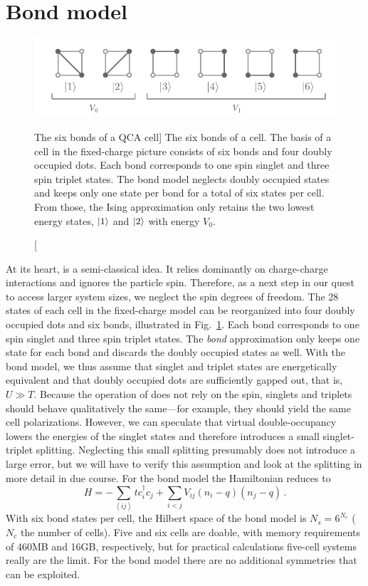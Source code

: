 \section{Bond model}

%
\begin{figure}
  \center
  \includegraphics{bond}
  \caption
  [The six bonds of a QCA cell]
  {
  \label{fig:bond}
  The six bonds of a  cell. The basis of a  cell in the
  fixed-charge picture consists of six bonds and four doubly occupied dots. Each
  bond corresponds to one spin singlet and three spin triplet states. The bond
  model neglects doubly occupied states and keeps only one state per bond for a
  total of six states per cell. From those, the Ising approximation only retains
  the two lowest energy states, $\left|1\right>$ and $\left|2\right>$ with energy $V_0$.
  }
\end{figure}
%
At its heart,  is a semi-classical idea. It relies dominantly on
charge-charge interactions and ignores the particle spin. Therefore, as a next
step in our quest to access larger system sizes, we neglect the spin degrees of
freedom. The 28 states of each cell in the fixed-charge model can be reorganized
into four doubly occupied dots and six bonds, illustrated in
Fig.~\ref{fig:bond}. Each bond corresponds to one spin singlet and three spin
triplet states. The \emph{bond} approximation only keeps one state for each bond
and discards the doubly occupied states as well. With the bond model, we thus
assume that singlet and triplet states are energetically equivalent and that
doubly occupied dots are sufficiently gapped out, that is, $U \gg T$. Because
the operation of  does not rely on the spin, singlets and triplets
should behave qualitatively the same---for example, they should yield the same
cell polarizations. However, we can speculate that virtual double-occupancy
lowers the energies of the singlet states and therefore introduces a small
singlet-triplet splitting. Neglecting this small splitting presumably does not
introduce a large error, but we will have to verify this assumption and look at
the splitting in more detail in due course. For the bond model the 
Hamiltonian reduces to
%
\begin{equation}
  \label{eq:H_bond}
  H = - \sum_{\left<ij\right>} t c_i^{\dagger} c_j
      + \sum_{i<j} V_{ij} \left( n_i - q \right) \left( n_j - q \right) \, .
\end{equation}
%
With six bond states per cell, the Hilbert space of the bond model is $N_s =
6^{N_c}$ ($N_c$ the number of cells). Five and six cells are doable, with memory
requirements of 460MB and 16GB, respectively, but for practical calculations
five-cell systems really are the limit. For the bond model there are no
additional symmetries that can be exploited.



